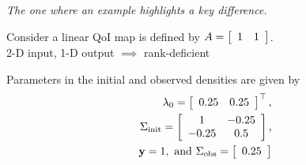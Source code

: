 \begin{frame}[t]{\it The one where an example highlights a key difference.}

\centering
Consider a linear QoI map is defined by $A=\mat{cc}{1 & 1}$. \\
2-D input, 1-D output $\implies$ rank-deficient

\vskip 12pt

Parameters in the initial and observed densities are given by
\begin{equation*}
\begin{split}
	\initialMean = \mat{cc}{0.25 & 0.25}^\top, \\
  \initialCov = \mat{cc}{1 & -0.25 \\ -0.25 & 0.5}, \\
  \observedMean=1, \text{ and } \observedCov = \mat{c}{0.25}
\end{split}
\end{equation*}

\end{frame}

